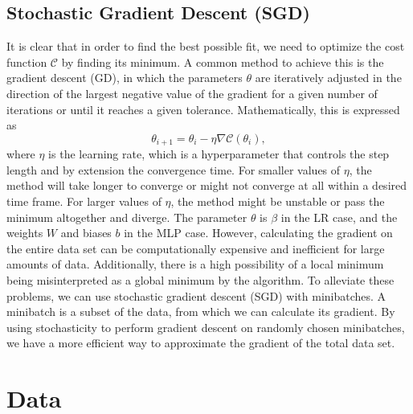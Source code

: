 \documentclass[a4paper, 11pt, twocolumn]{article}
\begin{document}
\subsection{Stochastic Gradient Descent (SGD)}
It is clear that in order to find the best possible fit, we need to optimize the cost function $\mathcal{C}$ by finding its minimum. A common method to achieve this is the gradient descent (GD), in which the parameters $\theta$ are iteratively adjusted in the direction of the largest negative value of the gradient for a given number of iterations or until it reaches a given tolerance. Mathematically, this is expressed as
\begin{equation}
\theta_{i+1} = \theta_i -\eta \nabla \mathcal{C}(\theta_i),
\end{equation}
where $\eta$ is the learning rate, which is a hyperparameter that controls the step length and by extension the convergence time. For smaller values of $\eta$, the method will take longer to converge or might not converge at all within a desired time frame. For larger values of $\eta$, the method might be unstable or pass the minimum altogether and diverge. The parameter $\theta$ is $\beta$ in the LR case, and the weights $W$ and biases $b$ in the MLP case.  
However, calculating the gradient on the entire data set can be computationally expensive and inefficient for large amounts of data. Additionally, there is a high possibility of a local minimum being misinterpreted as a global minimum by the algorithm. 
To alleviate these problems, we can use stochastic gradient descent (SGD) with minibatches.  A minibatch is a subset of the data, from which we can calculate its gradient. By using stochasticity to perform gradient descent on randomly chosen minibatches, we have a more efficient way to approximate the gradient of the total data set. 

\section{Data}
\end{document}
